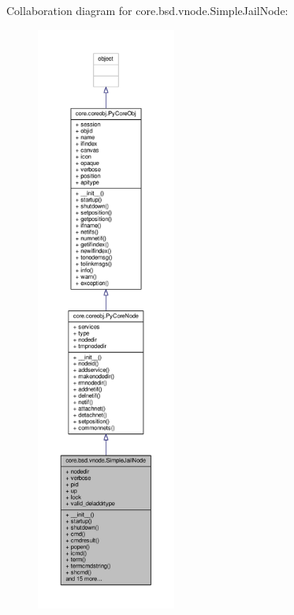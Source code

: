 Collaboration diagram for core.\+bsd.\+vnode.\+Simple\+Jail\+Node\+:
\nopagebreak
\begin{figure}[H]
\begin{center}
\leavevmode
\includegraphics[height=550pt]{classcore_1_1bsd_1_1vnode_1_1_simple_jail_node__coll__graph}
\end{center}
\end{figure}
